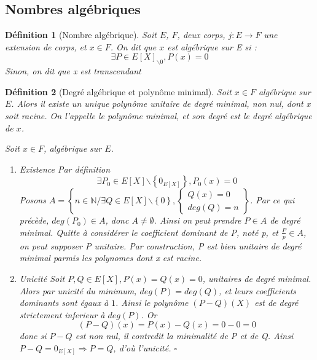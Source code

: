 \documentclass[a4paper,12pt,french]{report}
\newtheorem{definition}{Définition}[section]
\begin{document}
		\subsection{Nombres algébriques}
			\begin{definition}[Nombre algébrique]
				Soit \(E\), \(F\), deux corps, \(j : E \longrightarrow F\) une extension de corps, et \(x \in F\). On dit que \(x\) est \emph{algébrique} sur E si : 
				\[
					\exists P \in E[X]_{\backslash {0}} , P(x) = 0
				\]
				Sinon, on dit que x est \emph{transcendant}
			\end{definition}
			\begin{definition}[Degré algébrique et polynôme minimal]
				Soit \(x \in F \) algébrique sur \(E\). Alors il existe un unique polynôme unitaire de degré minimal, non nul, dont x soit racine. On l'appelle le \emph{polynôme minimal}, et son degré est le \emph{degré algébrique} de \(x\).{}
				
				\begin{preuve}
					Soit \(x \in F\), algébrique sur \(E\). 
					\begin{enumerate}
						\item \emph{Existence}
							Par définition
							\[\exists P_{0} \in E[X] {\backslash \left\{0_{E[X]}\right\} }, P_{0}(x) = 0 \]
							Posons \(A = 
							\left\{ n \in \mathbb{N} / \exists Q \in E[X] {\backslash \left\{0\right\} }, 
								\left\{
								\begin{array}{ll}
									Q(x) = 0 \\
									deg(Q) = n
								\end{array}
								\right.
							\right\}\). Par ce qui précède, \(deg(P_{0}) \in A \), donc \(A \neq \emptyset \). Ainsi on peut prendre \(P \in A\) de degré minimal. Quitte à considérer le coefficient dominant de P, noté p, et \(\frac{P}{p} \in A\), on peut supposer P unitaire. Par construction, P est bien unitaire de degré minimal parmis les polynomes dont x est racine.
						\item \emph{Unicité}
							Soit \(P,Q \in E[X], P(x) = Q(x) = 0 \), unitaires de degré minimal. Alors par unicité du minimum, \(deg(P) = deg(Q) \), et leurs coefficients dominants sont égaux à \(1\). Ainsi le polynôme \( (P-Q)(X) \) est de degré strictement inferieur à \(deg(P)\). Or 
							\[ (P-Q)(x) = P(x) - Q(x) = 0 - 0 = 0\]
							donc si \(P - Q\) est non nul, il contredit la minimalité de P et de Q. Ainsi \(P-Q = 0_{E[X]} \Rightarrow P = Q \), d'où l'unicité. \(\square\)
						
					\end{enumerate}
				\end{preuve}
			\end{definition}
			
\end{document}
